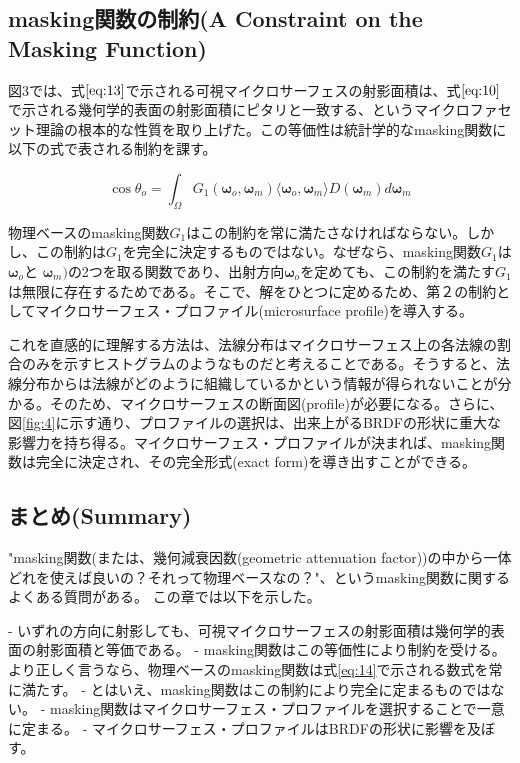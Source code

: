 \documentclass[a4j,xelatex,ja=standard]{bxjsarticle}
\begin{document}
\subsection{masking関数の制約(A Constraint on the Masking Function)}

図3では、式$\eqref{eq:13}$で示される可視マイクロサーフェスの射影面積は、式$\eqref{eq:10}$で示される幾何学的表面の射影面積にピタリと一致する、というマイクロファセット理論の根本的な性質を取り上げた。この等価性は統計学的なmasking関数に以下の式で表される制約を課す。

\begin{equation}
    \boxed{
    \cos \theta_o = \int_\Omega G_1(\boldsymbol{\omega}_o, \boldsymbol{\omega}_m) \langle \boldsymbol{\omega}_o, \boldsymbol{\omega}_m \rangle D(\boldsymbol{\omega}_m) d\boldsymbol{\omega}_m
    }
    \label{eq:14}
\end{equation}

物理ベースのmasking関数$G_1$はこの制約を常に満たさなければならない。しかし、この制約は$G_1$を完全に決定するものではない。なぜなら、masking関数$G_1$は$\boldsymbol{\omega}_o$と $\boldsymbol{\omega}_m)$の2つを取る関数であり、出射方向$\boldsymbol{\omega}_o$を定めても、この制約を満たす$G_1$は無限に存在するためである。そこで、解をひとつに定めるため、第２の制約としてマイクロサーフェス・プロファイル(microsurface profile)を導入する。

これを直感的に理解する方法は、法線分布はマイクロサーフェス上の各法線の割合のみを示すヒストグラムのようなものだと考えることである。そうすると、法線分布からは法線がどのように組織しているかという情報が得られないことが分かる。そのため、マイクロサーフェスの断面図(profile)が必要になる。さらに、図\ref{fig:4}に示す通り、プロファイルの選択は、出来上がるBRDFの形状に重大な影響力を持ち得る。マイクロサーフェス・プロファイルが決まれば、masking関数は完全に決定され、その完全形式(exact form)を導き出すことができる。

\subsection{まとめ(Summary)}

"masking関数(または、幾何減衰因数(geometric attenuation factor))の中から一体どれを使えば良いの？それって物理ベースなの？"、というmasking関数に関するよくある質問がある。
この章では以下を示した。

- いずれの方向に射影しても、可視マイクロサーフェスの射影面積は幾何学的表面の射影面積と等価である。
- masking関数はこの等価性により制約を受ける。より正しく言うなら、物理ベースのmasking関数は式\eqref{eq:14}で示される数式を常に満たす。
- とはいえ、masking関数はこの制約により完全に定まるものではない。
- masking関数はマイクロサーフェス・プロファイルを選択することで一意に定まる。
- マイクロサーフェス・プロファイルはBRDFの形状に影響を及ぼす。
\end{document}
